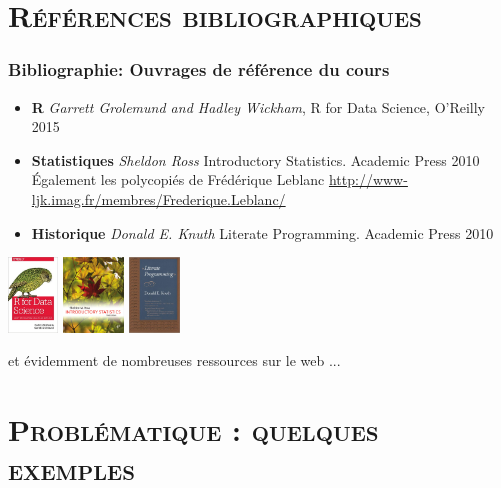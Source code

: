\documentclass[xcolor=x11names,compress,8pt]{beamer}
\renewcommand{\(}{\begin{columns}}
\renewcommand{\)}{\end{columns}}
\newcommand{\<}[1]{\begin{column}{#1}}
\renewcommand{\>}{\end{column}}
\begin{document}
\section[{\scshape Références}]{{\scshape Références bibliographiques} }
\begin{frame}
\frametitle{Bibliographie: Ouvrages de référence du cours}
\begin{itemize}
\item  \textbf{R} \textit{Garrett Grolemund and Hadley Wickham}, R for Data Science, O'Reilly 2015 
\item \textbf{Statistiques} \textit{Sheldon Ross} Introductory Statistics. Academic Press 2010\\
Également les polycopiés de Frédérique Leblanc \url{http://www-ljk.imag.fr/membres/Frederique.Leblanc/}
\item \textbf{Historique} \textit{Donald E. Knuth} Literate Programming. Academic Press 2010
\end{itemize}
\centerline{
\includegraphics[height=2cm]{Wickham.png}  \hspace{1cm} \includegraphics[height=2cm]{Ross.png}  \hspace{1cm} \includegraphics[height=2cm]{Knuth-Lit.png} 
}

et évidemment de nombreuses ressources sur le web ...
\end{frame} 
\section[{\scshape Problématique}]{{\scshape Problématique : quelques exemples} }
\end{document}
